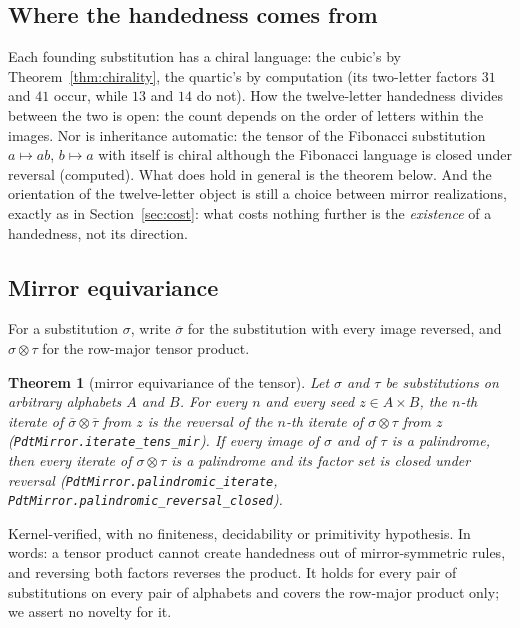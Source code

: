 \documentclass[11pt]{amsart}
\theoremstyle{plain}
\newtheorem{theorem}{Theorem}[section]
\theoremstyle{definition}
\theoremstyle{remark}
\begin{document}
\subsection{Where the handedness comes from}

Each founding substitution has a chiral language: the cubic's by Theorem~\ref{thm:chirality},
the quartic's by computation (its two-letter factors $31$ and $41$ occur, while $13$ and $14$
do not). How the twelve-letter handedness divides between the two is open: the count depends
on the order of letters within the images. Nor is inheritance automatic: the tensor of the
Fibonacci substitution $a \mapsto ab$, $b \mapsto a$ with itself is chiral although the
Fibonacci language is closed under reversal (computed). What does hold in general is the
theorem below. And the orientation of the twelve-letter object is still a choice between
mirror realizations, exactly as in Section~\ref{sec:cost}: what costs nothing further is the
\emph{existence} of a handedness, not its direction.

\subsection{Mirror equivariance}

For a substitution $\sigma$, write $\overline{\sigma}$ for the substitution with every image
reversed, and $\sigma \otimes \tau$ for the row-major tensor product.

\begin{theorem}[mirror equivariance of the tensor]\label{thm:mirror}
Let $\sigma$ and $\tau$ be substitutions on arbitrary alphabets $A$ and $B$. For every $n$ and
every seed $z \in A \times B$, the $n$-th iterate of
$\overline{\sigma} \otimes \overline{\tau}$ from $z$ is the reversal of the $n$-th iterate of
$\sigma \otimes \tau$ from $z$ \textup{(\texttt{PdtMirror.iterate\_tens\_mir})}. If every image
of $\sigma$ and of $\tau$ is a palindrome, then every iterate of $\sigma \otimes \tau$ is a
palindrome and its factor set is closed under reversal
\textup{(\texttt{PdtMirror.palindromic\_iterate}, \texttt{PdtMirror.palindromic\_reversal\_closed})}.
\end{theorem}

Kernel-verified, with no finiteness, decidability or primitivity hypothesis. In words: a
tensor product cannot create handedness out of mirror-symmetric rules, and reversing both
factors reverses the product. It holds for every pair of substitutions on every pair of
alphabets and covers the row-major product only; we assert no novelty for it.
\end{document}
